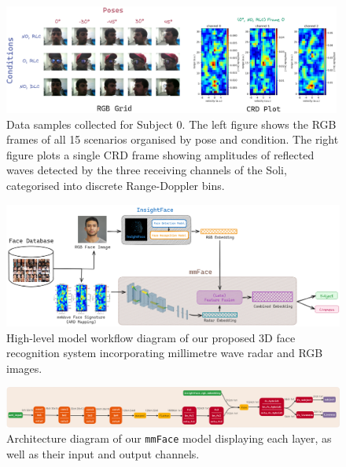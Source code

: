 \documentclass{mpaper}
\begin{document}
\begin{figure}[h!]
    \centering
    \vspace{-1cm}
    \includegraphics[width=0.99\textwidth]{figures/rgb_crd_plot.png}
    \vspace{0.2cm}
    \caption{Data samples collected for Subject 0. The left figure shows the RGB frames of all 15 scenarios organised by pose and condition. The right figure plots a single CRD frame showing amplitudes of reflected waves detected by the three receiving channels of the Soli, categorised into discrete Range-Doppler bins.}
    \label{fig:rgb_crd_plot}
\end{figure}

\begin{figure}[t]
    \centering
    \includegraphics[width=1\textwidth]{figures/model_workflow.png}
    \vspace{0.001cm}
    \caption{High-level model workflow diagram of our proposed 3D face recognition system incorporating millimetre wave radar and RGB images.}
    \label{fig:model_workflow}
    \vspace{0.1cm}
\end{figure}

\begin{figure}[h!]
    \centering
    \includegraphics[width=1.02\textwidth]{figures/model_architecture.png}
    \vspace{0.001cm}
    \caption{Architecture diagram of our \texttt{mmFace} model displaying each layer, as well as their input and output channels.}
    \label{fig:model_architecture}
    \vspace{-0.2cm}
\end{figure}
\end{document}
